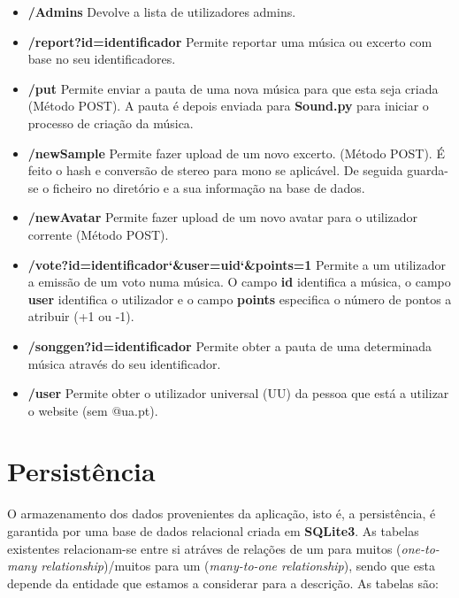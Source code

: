 \documentclass{report}
\begin{document}
\begin{itemize}
	\item \textbf{/Admins} Devolve a lista de utilizadores admins.

	\item \textbf{/report?id=identificador} Permite reportar uma música ou excerto com base no seu identificadores.

	\item \textbf{/put} Permite enviar a pauta de uma nova música para que esta seja criada (Método POST).
		A pauta é depois enviada para \textbf{Sound.py} para iniciar o processo de criação da música.

	\item \textbf{/newSample} Permite fazer upload de um novo excerto. (Método POST). É feito o hash e conversão de stereo para mono se aplicável. De seguida guarda-se o ficheiro no diretório e a sua informação na base de dados.

	\item \textbf{/newAvatar} Permite fazer upload de um novo avatar para o utilizador corrente (Método POST).

	\item \textbf{/vote?id=identificador\char`&user=uid\char`&points=1} Permite a um utilizador a emissão de um voto numa música.
		O campo \textbf{id} identifica a música, o campo \textbf{user} identifica o utilizador e o campo \textbf{points} especifica o número de pontos a atribuir (+1 ou -1).

	\item \textbf{/songgen?id=identificador} Permite obter a pauta de uma determinada música através do seu identificador.

	\item \textbf{/user} Permite obter o utilizador universal (UU) da pessoa que está a utilizar o website (sem @ua.pt).

\end{itemize}

\chapter{Persistência}
\label{chap.db}

O armazenamento dos dados provenientes da aplicação, isto é, a persistência, é garantida por uma base de dados relacional criada em \textbf{SQLite3}. As tabelas existentes relacionam-se entre si atráves de relações de um para muitos (\textit{one-to-many relationship})/muitos para um (\textit{many-to-one relationship}), sendo que esta depende da entidade que estamos a considerar para a descrição. As tabelas são:
\end{document}
